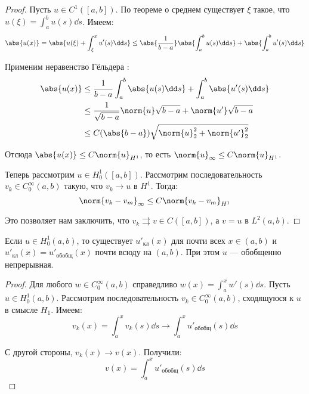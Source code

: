 \begin{proof}
  Пусть $u \in C^1([a, b])$. По теореме о среднем существует $\xi$ такое, что $u(\xi) = \int_a^b u(s) \dd s$. Имеем:
  \begin{equation}
    \abs{u(x)} = \abs{u(\xi) + \int_\xi^x u'(s) \dd s} \le \abs{\frac{1}{b-a}} \abs{\int_a^b u(s) \dd s} + \abs{\int_a^b u'(s) \dd s}
  \end{equation} 
  
  Применим неравенство Гёльдера :
  \begin{equation}
  \begin{aligned}
    \abs{u(x)} &\le \frac{1}{b-a} \int_a^b \abs{u(s) \dd s} + \int_a^b \abs{u'(s) \dd s} \\
    &\le \frac{1}{\sqrt{b - a}} \norm{u} \sqrt{b - a} + \norm{u'} \sqrt{b-a} \\
    &\le C(\abs{b-a}) \sqrt{\norm{u}_2^2 + \norm{u'}_2^2}
  \end{aligned}
  \end{equation}
  
  Отсюда $\abs{u(x)} \le C \norm{u}_{H^1}$, то есть $\norm{u}_\infty \le C \norm{u}_{H^1}$.
  
  Теперь рассмотрим $u \in H_0^1([a, b])$. Рассмотрим последовательность $v_k \in C_0^\infty(a, b)$ такую, что $v_k \to u$ в $H^1$. Тогда:
  \begin{equation}
    \norm{v_k - v_m}_\infty \le C\norm{v_k - v_m}_{H^1}
  \end{equation}
  
  Это позволяет нам заключить, что $v_k \rightrightarrows v \in C([a, b])$, а $v = u$ в $L^2(a, b)$.
\end{proof}


\begin{cor}
  Если $u \in H_0^1(a, b)$, то существует $u'_{кл}(x)$ для почти всех $x \in (a, b)$ и $u'_{кл}(x) = u'_{обобщ}(x)$ почти всюду на $(a, b)$. При этом $u$ --- обобщенно непрерывная.
\end{cor}

\begin{proof}
  Для любого $w \in C_0^\infty(a, b)$ справедливо $w(x) = \int_a^x w'(s) \dd s$. Пусть $u \in H_0^1(a, b)$. Рассмотрим последовательность $v_k \in C_0^\infty (a, b)$, сходящуюся к $u$ в смысле $H_1$. Имеем:
  \begin{equation}
    v_k(x) = \int_a^x v_k(s) \dd s \to \int_a^x u'_{обобщ}(s) \dd s
  \end{equation}
  
  С другой стороны, $v_k(x) \to v(x)$. Получили:
  \begin{equation}
    v(x) = \int_a^x u'_{обобщ}(s) \dd s
  \end{equation}
\end{proof}

